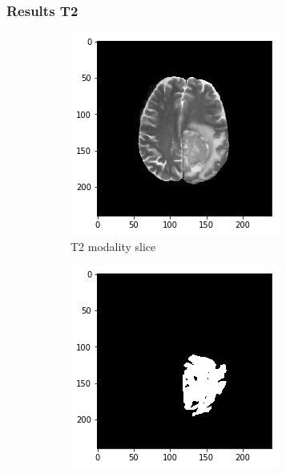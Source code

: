 \subsubsection{Results T2}

\begin{figure}[H]
    \centering
    \begin{subfigure}[t]{.4\textwidth}
        \centering
        \includegraphics[width=\linewidth]{chapters/06_hdm/b_Brats18_TCIA08_242_1_L2/31.png}
        \caption{T2 modality slice}
    \end{subfigure}\hspace{1cm}%
    \begin{subfigure}[t]{.4\textwidth}
        \centering
        \includegraphics[width=\linewidth]{chapters/06_hdm/b_Brats18_TCIA08_242_1_L2/30.png}

\end{subfigure}
\end{figure}
